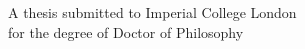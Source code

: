 \begin{titlepage}
\begin{center}
\end{center}

\vspace{\fill}

\centering


\vspace{\fill}

\hspace*{-0.5cm}
\vspace*{-2cm}

  \begin{center}
  \small{ A thesis submitted to Imperial College London}\\
    \small{for the degree of Doctor of Philosophy} \\%
      \end{center}


\end{titlepage}


\pagestyle{empty}  %


\newpage

